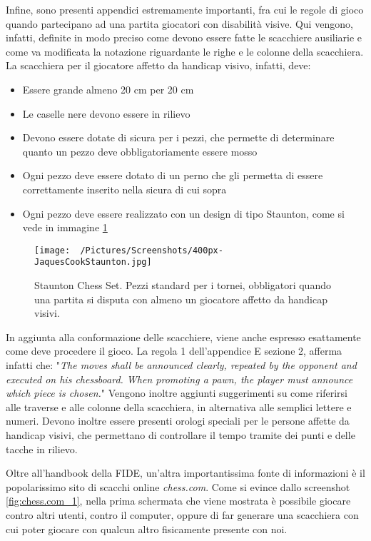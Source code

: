 \documentclass[12pt]{book}
\begin{document}
Infine, sono presenti appendici estremamente importanti, fra cui le
regole di gioco quando partecipano ad una partita giocatori con 
disabilità visive. Qui vengono,
infatti, definite in modo preciso come devono essere fatte le
scacchiere ausiliarie e come va modificata la notazione riguardante le
righe e le colonne della scacchiera. La scacchiera per il giocatore
affetto da handicap visivo, infatti, deve:

\begin{itemize}
  \item Essere grande almeno 20 cm per 20 cm
  \item Le caselle nere devono essere in rilievo
  \item Devono essere dotate di sicura per i pezzi, che permette di
    determinare quanto un pezzo deve obbligatoriamente essere mosso
  \item Ogni pezzo deve essere dotato di un perno che gli permetta di
    essere correttamente inserito nella sicura di cui sopra
  \item Ogni pezzo deve essere realizzato con un design di tipo
    Staunton, come si vede in immagine \ref{fig:pezzi_staunton}
\end{itemize}

\begin{figure}[h]
  \caption{Staunton Chess Set. Pezzi standard per i tornei, obbligatori
  quando una partita si disputa con almeno un giocatore affetto da handicap visivi.}
  \centering
  \label{fig:pezzi_staunton}
  \texttt{[image: ~/Pictures/Screenshots/400px-JaquesCookStaunton.jpg]}
\end{figure} 

In aggiunta alla conformazione delle scacchiere, viene anche espresso
esattamente come deve procedere il gioco. La regola 1 dell'appendice E
sezione 2, afferma infatti che: "\textit{The moves shall be announced clearly, repeated by the opponent and executed on his
chessboard. When promoting a pawn, the player must announce which piece is
chosen.}" Vengono inoltre aggiunti suggerimenti su come riferirsi alle
traverse e alle colonne della scacchiera, in alternativa alle semplici
lettere e numeri. Devono inoltre essere presenti orologi speciali per
le persone affette da handicap visivi, che permettano di controllare
il tempo tramite dei punti e delle tacche in rilievo.

Oltre all'handbook della FIDE, un'altra importantissima fonte di
informazioni è il popolarissimo sito di scacchi online
\textit{chess.com}. Come si evince dallo screenshot
\ref{fig:chess.com_1}, nella prima schermata che viene mostrata è
possibile giocare contro altri utenti, contro il computer, oppure di
far generare una scacchiera con cui poter giocare con qualcun altro
fisicamente presente con noi.
\end{document}
